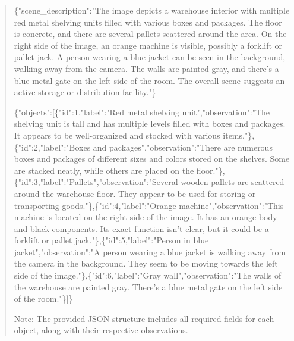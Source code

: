 \documentclass[10pt,a4paper]{article}
\begin{document}
\begin{quote}\footnotesize
\{"scene\_description":\allowbreak{}"The image depicts a warehouse interior with multiple red metal shelving units filled with various boxes and packages. The floor is concrete,\allowbreak{} and there are several pallets scattered around the area. On the right side of the image,\allowbreak{} an orange machine is visible,\allowbreak{} possibly a forklift or pallet jack. A person wearing a blue jacket can be seen in the background,\allowbreak{} walking away from the camera. The walls are painted gray,\allowbreak{} and there's a blue metal gate on the left side of the room. The overall scene suggests an active storage or distribution facility."\}\par
\par
\{"objects":\allowbreak{}[\{"id":\allowbreak{}1,\allowbreak{}"label":\allowbreak{}"Red\allowbreak{} metal shelving unit",\allowbreak{}"observation":\allowbreak{}"The shelving unit is tall and has multiple levels filled with boxes and packages. It appears to be well-organized and stocked with various items."\},\allowbreak{}\{"id":\allowbreak{}2,\allowbreak{}"label":\allowbreak{}"Boxes and packages",\allowbreak{}"observation":\allowbreak{}"There are numerous boxes and packages of different sizes and colors stored on the shelves. Some are stacked neatly,\allowbreak{} while others are placed on the floor."\},\allowbreak{}\{"id":\allowbreak{}3,\allowbreak{}"label":\allowbreak{}"Pallet\allowbreak{}s",\allowbreak{}"observation":\allowbreak{}"Several wooden pallets are scattered around the warehouse floor. They appear to be used for storing or transporting goods."\},\allowbreak{}\{"id":\allowbreak{}4,\allowbreak{}"label":\allowbreak{}"Orange\allowbreak{} machine",\allowbreak{}"observation":\allowbreak{}"This machine is located on the right side of the image. It has an orange body and black components. Its exact function isn't clear,\allowbreak{} but it could be a forklift or pallet jack."\},\allowbreak{}\{"id":\allowbreak{}5,\allowbreak{}"label":\allowbreak{}"Person in blue jacket",\allowbreak{}"observation":\allowbreak{}"A person wearing a blue jacket is walking away from the camera in the background. They seem to be moving towards the left side of the image."\},\allowbreak{}\{"id":\allowbreak{}6,\allowbreak{}"label":\allowbreak{}"Gray wall",\allowbreak{}"observation":\allowbreak{}"The walls of the warehouse are painted gray. There's a blue metal gate on the left side of the room."\}]\}\par
\par
Note:\allowbreak{} The provided JSON structure includes all required fields for each object,\allowbreak{} along with their respective observations.
\end{quote}
\end{document}

